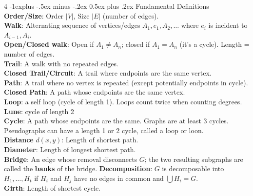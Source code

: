 \documentclass[letterpaper, 8pt]{extarticle}
\makeatletter
\renewcommand{\section}{\@startsection{section}{1}{0mm}%
	{-1explus -.5ex minus -.2ex}%
	{0.5ex plus .2ex}%
	{\normalfont\normalsize\bfseries}}
\makeatother
\begin{document}
\begin{multicols*}{4}
	\section{Fundamental Definitions}
	\textbf{Order/Size}: Order $|V|$, Size $|E|$ (number of edges). \\
	\textbf{Walk}: Alternating sequence of vertices/edges $A_1, e_1, A_2, \dots$ where $e_i$ is incident to $A_{i-1}, A_i$. \\
	\textbf{Open/Closed walk}: Open if $A_1 \ne A_n$; closed if $A_1 = A_n$ (it's a cycle). Length = number of edges. \\
	\textbf{Trail}: A walk with no repeated edges. \\
	\textbf{Closed Trail/Circuit}: A trail where endpoints are the same vertex. \\
	\textbf{Path}: A trail where no vertex is repeated (except potentially endpoints in cycle). \\
	\textbf{Closed Path}: A path whose endpoints are the same vertex. \\
	\textbf{Loop}: a self loop (cycle of length 1). Loops count twice when counting degrees.\\
	\textbf{Lune}: cycle of length 2 \\
	\textbf{Cycle}: A path whose endpoints are the same. Graphs are at least 3 cycles. Pseudographs can have a length 1 or 2 cycle, called a loop or loon. \\
	\textbf{Distance} $d(x,y)$: Length of shortest path. \\
	\textbf{Diameter}: Length of longest shortest path. \\
	\textbf{Bridge}: An edge whose removal disconnects $G$; the two resulting subgraphs are called the \textbf{banks} of the bridge.
	\textbf{Decomposition}: $G$ is decomposable into $H_1, \dots, H_t$ if $H_i$ and $H_j$ have no edges in common and $\bigcup H_i = G$. \\
	\textbf{Girth}: Length of shortest cycle. \\


\end{multicols*}
\end{document}
